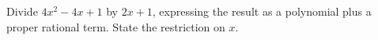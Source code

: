 Divide $4x^2-4x+1$ by $2x+1$, expressing the result as a polynomial plus a proper rational term. State the restriction on $x$.
